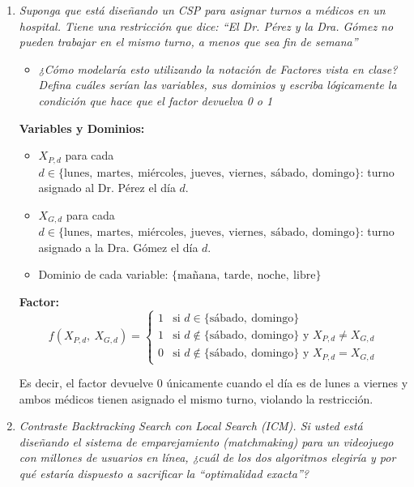 \documentclass[11pt]{article}
\begin{document}
\begin{enumerate}
  \item \textit{Suponga que está diseñando un CSP para asignar turnos a médicos en un hospital.
    Tiene una restricción que dice: ``El Dr. Pérez y la Dra. Gómez no pueden trabajar en el mismo
    turno, a menos que sea fin de semana''}
    \begin{itemize}
      \item \textit{¿Cómo modelaría esto utilizando la notación de Factores vista en clase? Defina
        cuáles serían las variables, sus dominios y escriba lógicamente la condición que hace que
        el factor devuelva 0 o 1}
    \end{itemize}

  \vspace{0.5em}
  \textbf{Variables y Dominios:}
  \begin{itemize}
    \item $X_{P,d}$ para cada $d \in \{\text{lunes},\ \text{martes},\ \text{miércoles},\
      \text{jueves},\ \text{viernes},\ \text{sábado},\ \text{domingo}\}$: turno asignado al
      Dr. Pérez el día $d$.
    \item $X_{G,d}$ para cada $d \in \{\text{lunes},\ \text{martes},\ \text{miércoles},\
      \text{jueves},\ \text{viernes},\ \text{sábado},\ \text{domingo}\}$: turno asignado a la
      Dra. Gómez el día $d$.
    \item Dominio de cada variable: $\{\text{mañana},\ \text{tarde},\ \text{noche},\ \text{libre}\}$
  \end{itemize}

  \vspace{0.5em}
  \textbf{Factor:}
  \[
    f(X_{P,d},\ X_{G,d}) =
    \begin{cases}
      1 & \text{si } d \in \{\text{sábado},\ \text{domingo}\} \\
      1 & \text{si } d \notin \{\text{sábado},\ \text{domingo}\} \text{ y } X_{P,d} \neq X_{G,d} \\
      0 & \text{si } d \notin \{\text{sábado},\ \text{domingo}\} \text{ y } X_{P,d} = X_{G,d}
    \end{cases}
  \]

  Es decir, el factor devuelve $0$ únicamente cuando el día es de lunes a viernes y ambos médicos
  tienen asignado el mismo turno, violando la restricción.

  \item \textit{Contraste Backtracking Search con Local Search (ICM). Si usted está diseñando el
    sistema de emparejamiento (\textit{matchmaking}) para un videojuego con millones de usuarios
    en línea, ¿cuál de los dos algoritmos elegiría y por qué estaría dispuesto a sacrificar la
    ``optimalidad exacta''?}


\end{enumerate}
\end{document}
